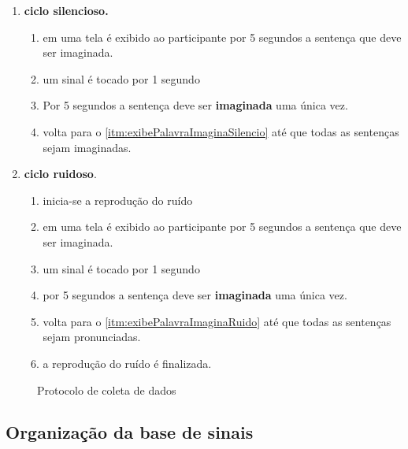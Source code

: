 			    \begin{enumerate}
			    	\item \textbf{ciclo silencioso.}
			    	\begin{enumerate}
			    		\item em uma tela é exibido ao participante por 5 segundos a sentença que deve ser imaginada.\label{itm:exibePalavraImaginaSilencio}
			    		\item um sinal é tocado por 1 segundo
			    		\item Por 5 segundos a sentença deve ser \textbf{imaginada} uma única vez.
			    		\item volta para o \autoref{itm:exibePalavraImaginaSilencio} até que todas as sentenças sejam imaginadas.
			    	\end{enumerate}
			    	\item \textbf{ciclo ruidoso}.
			    	\begin{enumerate}
			    		\item inicia-se a reprodução do ruído
			    		\item em uma tela é exibido ao participante por 5 segundos a sentença que deve ser imaginada.\label{itm:exibePalavraImaginaRuido}
			    		\item um sinal é tocado por 1 segundo
			    		\item por 5 segundos a sentença deve ser \textbf{imaginada} uma única vez.
			    		\item volta para o \autoref{itm:exibePalavraImaginaRuido} até que todas as sentenças sejam pronunciadas.
			    		\item a reprodução do ruído é finalizada.
			    	\end{enumerate}
			    \end{enumerate}
			    
				\begin{figure}[H]
					\centering
					\caption{Protocolo de coleta de dados}
				\end{figure}
				

	    \subsection{Organização da base de sinais}


